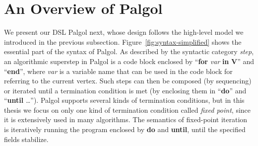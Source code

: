 \documentclass{sokendai_thesis} %
\begin{document}
\section{An Overview of Palgol}
\label{sec:syntax}

We present our DSL Palgol next, whose design follows the high-level model we introduced in the previous subsection.
Figure~\ref{fig:syntax-simplified} shows the essential part of the syntax of Palgol.
As described by the syntactic category \textit{step}, an algorithmic superstep in Palgol is a code block
enclosed by ``\textbf{for} \textit{var} \textbf{in} \textbf{V}'' and ``\textbf{end}'', where \textit{var} is a variable name that can be used in the code block for referring to the current vertex.
Such steps can then be composed (by sequencing) or iterated until a termination condition is met (by enclosing them in ``\textbf{do}'' and ``\textbf{until} \ldots'').
Palgol supports several kinds of termination conditions, but in this thesis we focus on only one kind of termination condition called \textit{fixed point}, since it is extensively used in many algorithms.
The semantics of fixed-point iteration is iteratively running the program enclosed by \textbf{do} and \textbf{until}, until the specified fields stabilize.
\end{document}
